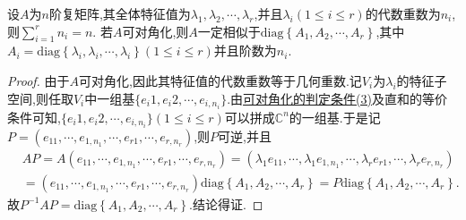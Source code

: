 \documentclass[../../main.tex]{subfiles}%
\begin{document}
\begin{theorem}\label{theorem:矩阵可对角化一定相似于由其全体特征值构成的对角阵}
设$A$为$n$阶复矩阵,其全体特征值为$\lambda_1,\lambda_2,\cdots,\lambda_r$,并且$\lambda_i\left( 1\leqslant i\leqslant r \right)$的代数重数为$n_i$,则$\sum_{i=1}^{r}n_i=n$. 若$A$可对角化,则$A$一定相似于$\mathrm{diag}\left\{ A_1,A_2,\cdots ,A_r \right\}$,其中$A_i=\mathrm{diag}\left\{ \lambda _i,\lambda _i,\cdots ,\lambda _i \right\} \left( 1\leqslant i\leqslant r \right)$并且阶数为$n_i$.
\end{theorem}
\begin{proof}

由于$A$可对角化,因此其特征值的代数重数等于几何重数.记$V_i$为$\lambda_i$的特征子空间,则任取$V_i$中一组基$\{e_i1,e_i2,\cdots,e_{i,n_i}\}$.由\hyperref[theorem:可对角化的判定条件]{可对角化的判定条件(3)}及直和的等价条件可知,$\{e_i1,e_i2,\cdots,e_{i,n_i}\}\left( 1\leqslant i\leqslant r \right)$可以拼成$\mathbb{C}^n$的一组基.于是记$P=(e_{11},\cdots,e_{1,n_1},\cdots,e_{r1},\cdots,e_{r,n_r})$,则$P$可逆,并且
\begin{align*}
&AP=A\left( e_{11},\cdots ,e_{1,n_1},\cdots ,e_{r1},\cdots ,e_{r,n_r} \right) =\left( \lambda _1e_{11},\cdots ,\lambda _1e_{1,n_1},\cdots ,\lambda _re_{r1},\cdots ,\lambda _re_{r,n_r} \right) 
\\
&=\left( e_{11},\cdots ,e_{1,n_1},\cdots ,e_{r1},\cdots ,e_{r,n_r} \right) \mathrm{diag}\left\{ A_1,A_2,\cdots ,A_r \right\} =P\mathrm{diag}\left\{ A_1,A_2,\cdots ,A_r \right\} .
\end{align*}
故$P^{-1}AP=\mathrm{diag}\left\{ A_1,A_2,\cdots ,A_r \right\} .$结论得证.

\end{proof}
\end{document}
